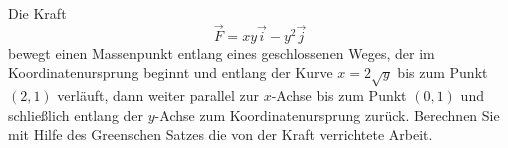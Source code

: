 \begin{atiTask}[
  title = Kraft und Arbeit
]
Die Kraft
\[
\vec{F}=xy\vec{i}-y^2\vec{j}
\]
bewegt einen Massenpunkt entlang eines geschlossenen Weges, der im Koordinatenursprung beginnt und entlang der Kurve $x=2\sqrt{y}$ bis zum Punkt $(2,1)$ verläuft, dann weiter parallel zur $x$-Achse bis zum Punkt $(0,1)$ und schließlich entlang der $y$-Achse zum Koordinatenursprung zurück. Berechnen Sie mit Hilfe des Greenschen Satzes die von der Kraft verrichtete Arbeit.
\end{atiTask}